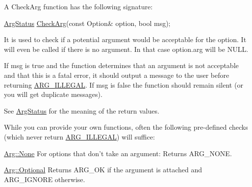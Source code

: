 A Check\-Arg function has the following signature\-: 
\begin{DoxyCode}
\hyperlink{namespace_option_parser_ad237d47d58c66dea8dcf4f53ac11a6e4}{ArgStatus} \hyperlink{namespace_option_parser_aee9955553cc70fd9fd41849622680c6a}{CheckArg}(\textcolor{keyword}{const} Option& option, \textcolor{keywordtype}{bool} msg); 
\end{DoxyCode}


It is used to check if a potential argument would be acceptable for the option. It will even be called if there is no argument. In that case {\ttfamily option.\-arg} will be {\ttfamily N\-U\-L\-L}.

If {\ttfamily msg} is {\ttfamily true} and the function determines that an argument is not acceptable and that this is a fatal error, it should output a message to the user before returning \hyperlink{namespace_option_parser_ad237d47d58c66dea8dcf4f53ac11a6e4a6ea016ff6334ed0d2ec885e96a76c472}{A\-R\-G\-\_\-\-I\-L\-L\-E\-G\-A\-L}. If {\ttfamily msg} is {\ttfamily false} the function should remain silent (or you will get duplicate messages).

See \hyperlink{namespace_option_parser_ad237d47d58c66dea8dcf4f53ac11a6e4}{Arg\-Status} for the meaning of the return values.

While you can provide your own functions, often the following pre-\/defined checks (which never return \hyperlink{namespace_option_parser_ad237d47d58c66dea8dcf4f53ac11a6e4a6ea016ff6334ed0d2ec885e96a76c472}{A\-R\-G\-\_\-\-I\-L\-L\-E\-G\-A\-L}) will suffice\-:

\begin{DoxyItemize}
\item {\ttfamily \hyperlink{struct_option_parser_1_1_arg_afd9e5e7362e4accc619fe7dee7098956}{Arg\-::\-None}} For options that don't take an argument\-: Returns A\-R\-G\-\_\-\-N\-O\-N\-E.  \item {\ttfamily \hyperlink{struct_option_parser_1_1_arg_a3fcea82be66b4aff1971cbab6deabdf1}{Arg\-::\-Optional}} Returns A\-R\-G\-\_\-\-O\-K if the argument is attached and A\-R\-G\-\_\-\-I\-G\-N\-O\-R\-E otherwise.  \end{DoxyItemize}


